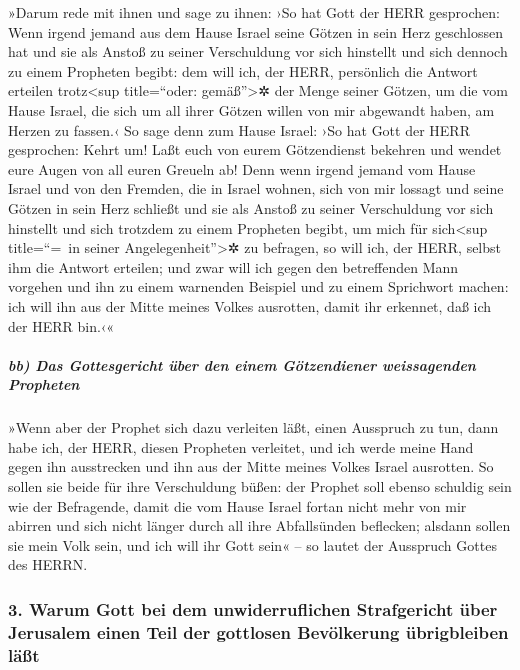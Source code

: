 »Darum rede mit ihnen und sage zu ihnen: ›So hat Gott der
HERR gesprochen: Wenn irgend jemand aus dem Hause Israel seine Götzen in
sein Herz geschlossen hat und sie als Anstoß zu seiner Verschuldung vor
sich hinstellt und sich dennoch zu einem Propheten begibt: dem will ich,
der HERR, persönlich die Antwort erteilen trotz\textless sup
title=``oder: gemäß''\textgreater✲ der Menge seiner Götzen,
um die vom Hause Israel, die sich um all ihrer Götzen
willen von mir abgewandt haben, am Herzen zu fassen.‹ So
sage denn zum Hause Israel: ›So hat Gott der HERR gesprochen: Kehrt um!
Laßt euch von eurem Götzendienst bekehren und wendet eure Augen von all
euren Greueln ab! Denn wenn irgend jemand vom Hause Israel
und von den Fremden, die in Israel wohnen, sich von mir lossagt und
seine Götzen in sein Herz schließt und sie als Anstoß zu seiner
Verschuldung vor sich hinstellt und sich trotzdem zu einem Propheten
begibt, um mich für sich\textless sup title=``=~in seiner
Angelegenheit''\textgreater✲ zu befragen, so will ich, der HERR, selbst
ihm die Antwort erteilen; und zwar will ich gegen den
betreffenden Mann vorgehen und ihn zu einem warnenden Beispiel und zu
einem Sprichwort machen: ich will ihn aus der Mitte meines Volkes
ausrotten, damit ihr erkennet, daß ich der HERR bin.‹«

\hypertarget{bb-das-gottesgericht-uxfcber-den-einem-guxf6tzendiener-weissagenden-propheten}{%
\subparagraph{bb) Das Gottesgericht über den einem Götzendiener
weissagenden
Propheten}\label{bb-das-gottesgericht-uxfcber-den-einem-guxf6tzendiener-weissagenden-propheten}}

»Wenn aber der Prophet sich dazu verleiten läßt, einen
Ausspruch zu tun, dann habe ich, der HERR, diesen Propheten verleitet,
und ich werde meine Hand gegen ihn ausstrecken und ihn aus der Mitte
meines Volkes Israel ausrotten. So sollen sie beide für
ihre Verschuldung büßen: der Prophet soll ebenso schuldig sein wie der
Befragende, damit die vom Hause Israel fortan nicht mehr
von mir abirren und sich nicht länger durch all ihre Abfallsünden
beflecken; alsdann sollen sie mein Volk sein, und ich will ihr Gott
sein« -- so lautet der Ausspruch Gottes des HERRN.

\hypertarget{warum-gott-bei-dem-unwiderruflichen-strafgericht-uxfcber-jerusalem-einen-teil-der-gottlosen-bevuxf6lkerung-uxfcbrigbleiben-luxe4uxdft}{%
\subsubsection{3. Warum Gott bei dem unwiderruflichen Strafgericht über
Jerusalem einen Teil der gottlosen Bevölkerung übrigbleiben
läßt}\label{warum-gott-bei-dem-unwiderruflichen-strafgericht-uxfcber-jerusalem-einen-teil-der-gottlosen-bevuxf6lkerung-uxfcbrigbleiben-luxe4uxdft}}

